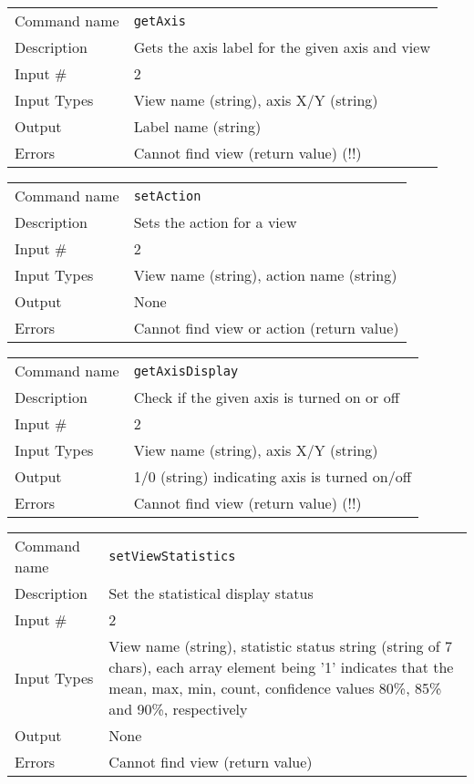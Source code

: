 \bigskip

\noindent
\begin{tabular}{l|p{5in}}
\hline
Command name & {\tt getAxis} \\
Description  & Gets the axis label for the given axis and view \\
Input \#     & 2 \\
Input Types  & View name (string), axis X/Y (string) \\
Output       & Label name (string) \\
Errors       & Cannot find view (return value) (!!) \\
\hline
\end{tabular}

\bigskip

\noindent
\begin{tabular}{l|p{5in}}
\hline
Command name & {\tt setAction} \\
Description  & Sets the action for a view \\
Input \#     & 2 \\
Input Types  & View name (string), action name (string) \\
Output       & None \\
Errors       & Cannot find view or action (return value) \\
\hline
\end{tabular}

\bigskip

\noindent
\begin{tabular}{l|p{5in}}
\hline
Command name & {\tt getAxisDisplay} \\
Description  & Check if the given axis is turned on or off \\
Input \#     & 2 \\
Input Types  & View name (string), axis  X/Y (string) \\
Output       & 1/0 (string) indicating axis is turned on/off \\
Errors       & Cannot find view (return value) (!!) \\
\hline
\end{tabular}

\bigskip

\noindent
\begin{tabular}{l|p{5in}}
\hline
Command name & {\tt setViewStatistics} \\
Description  & Set the statistical display status \\
Input \#     & 2 \\
Input Types  & View name (string), statistic status string (string
               of 7 chars), each array element being '1' indicates
               that the mean, max, min, count, confidence values 80\%,
               85\% and 90\%, respectively \\
Output       & None \\
Errors       & Cannot find view (return value) \\
\hline
\end{tabular}

